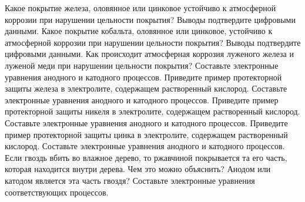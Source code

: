 \Qvery 
Какое покрытие железа, оловянное или цинковое устойчиво к атмосферной коррозии при нарушении цельности покрытия? Выводы подтвердите цифровыми данными.
\endQvery
\Qvery 
Какое покрытие кобальта, оловянное или цинковое, устойчиво к атмосферной коррозии при нарушении цельности покрытия? Выводы подтвердите цифровыми данными.
\endQvery
\Qvery 
Как происходит атмосферная коррозия луженого железа и луженой меди при нарушении цельности покрытия? Составьте электронные уравнения анодного и катодного процессов.
\endQvery
\Qvery 
Приведите пример протекторной защиты железа в электролите, содержащем растворенный кислород. Составьте электронные уравнения анодного и катодного процессов. 
\endQvery
\Qvery 
Приведите пример протекторной защиты никеля в электролите, содержащем растворенный кислород. Составьте электронные уравнения анодного и катодного процессов.
\endQvery
\Qvery 
Приведите пример протекторной защиты цинка в электролите, содержащем растворенный кислород. Составьте электронные уравнения анодного и катодного процессов.
\endQvery
\Qvery 
Если гвоздь вбить во влажное дерево, то ржавчиной покрывается та его часть, которая находится внутри дерева. Чем это можно объяснить? Анодом или катодом является эта часть гвоздя? Составьте электронные уравнения соответствующих процессов. 
\endQvery